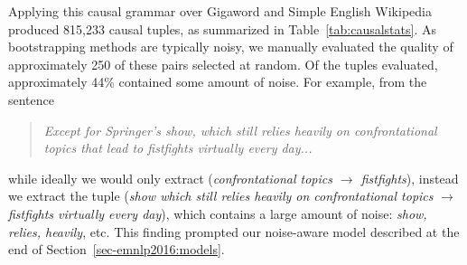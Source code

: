 
Applying this causal grammar over Gigaword and Simple English Wikipedia produced 815,233 causal tuples, as summarized in Table~\ref{tab:causalstats}. As bootstrapping methods are typically noisy, we manually evaluated the quality of approximately 250 of these pairs selected at random.  Of the tuples evaluated, approximately 44\% contained some amount of noise. For example, from the sentence 
\begin{quote}
\emph{Except for Springer's show, which still relies heavily on confrontational topics that lead to fistfights virtually every day...}
\end{quote}
while ideally we would only extract (\emph{confrontational topics $\rightarrow$ fistfights}), instead we extract the tuple (\emph{show which still relies heavily on confrontational topics} $\rightarrow$ \emph{fistfights virtually every day}), which contains a large amount of noise: \emph{show, relies, heavily}, etc.
This finding prompted our noise-aware model described at the end of Section~\ref{sec-emnlp2016:models}.


